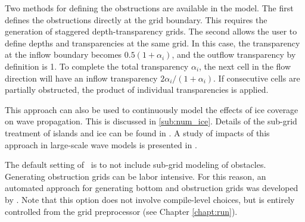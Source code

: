 Two methods for defining the obstructions are available in the model. The
first defines the obstructions directly at the grid boundary. This requires
the generation of staggered depth-transparency grids. The second allows the
user to define depths and transparencies at the same grid. In this case, the
transparency at the inflow boundary becomes $0.5(1+\alpha_i)$, and the outflow
transparency by definition is 1. To complete the total transparency
$\alpha_i$, the next cell in the flow direction will have an inflow
transparency $2\alpha_i/(1+\alpha_i)$. If consecutive cells are partially
obstructed, the product of individual transparencies is applied.

This approach can also be used to continuously model the effects of ice
coverage on wave propagation. This is discussed in \para\ref{sub:num_ice}.
Details of the sub-grid treatment of islands and ice can be found in
\cite{tol:OMOD03a}. A study of impacts of this approach in large-scale wave
models is presented in \cite{tol:OMB02b,tol:OMOD03a}.

The default setting of \ws\ is to not include sub-grid modeling of
obstacles. Generating obstruction grids can be labor intensive. For this
reason, an automated approach for generating bottom and obstruction grids was
developed by \cite{tol:MMAB07a, tol:OMOD08a}.  Note that this option does not
involve compile-level choices, but is entirely controlled from the grid
preprocessor (see Chapter \ref{chapt:run}).

